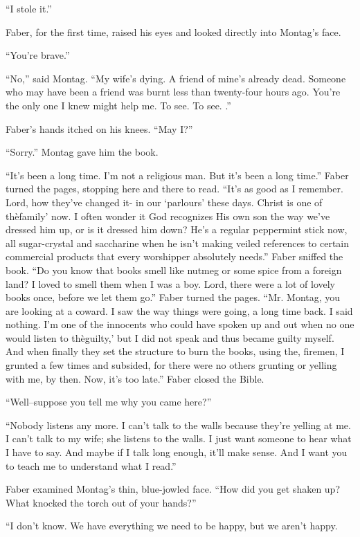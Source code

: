 \documentclass[11pt,openany]{book}
\begin{document}
``I stole it.''

Faber, for the first time, raised his eyes and looked directly into Montag's face.

``You're brave.''

``No,'' said Montag. ``My wife's dying. A friend of mine's already dead. Someone who may have been a friend was burnt less than twenty-four hours ago. You're the only one I knew might help me. To see. To see. .''

Faber's hands itched on his knees. ``May I?''

``Sorry.'' Montag gave him the book.

``It's been a long time. I'm not a religious man. But it's been a long time.'' Faber turned the pages, stopping here and there to read. ``It's as good as I remember. Lord, how they've changed it- in our `parlours' these days. Christ is one of thèfamily' now. I often wonder it God recognizes His own son the way we've dressed him up, or is it dressed him down? He's a regular peppermint stick now, all sugar-crystal and saccharine when he isn't making veiled references to certain commercial products that every worshipper absolutely needs.'' Faber sniffed the book. ``Do you know that books smell like nutmeg or some spice from a foreign land? I loved to smell them when I was a boy. Lord, there were a lot of lovely books once, before we let them go.'' Faber turned the pages. ``Mr. Montag, you are looking at a coward. I saw the way things were going, a long time back. I said nothing. I'm one of the innocents who could have spoken up and out when no one would listen to thèguilty,' but I did not speak and thus became guilty myself. And when finally they set the structure to burn the books, using the, firemen, I grunted a few times and subsided, for there were no others grunting or yelling with me, by then. Now, it's too late.'' Faber closed the Bible.

``Well--suppose you tell me why you came here?''

``Nobody listens any more. I can't talk to the walls because they're yelling at me. I can't talk to my wife; she listens to the walls. I just want someone to hear what I have to say. And maybe if I talk long enough, it'll make sense. And I want you to teach me to understand what I read.''

Faber examined Montag's thin, blue-jowled face. ``How did you get shaken up? What knocked the torch out of your hands?''

``I don't know. We have everything we need to be happy, but we aren't happy.
\end{document}
